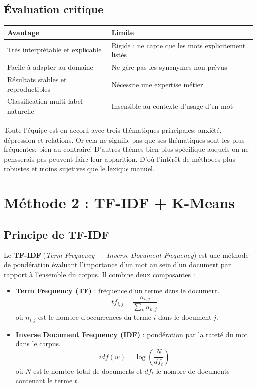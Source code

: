 \documentclass[12pt,a4paper]{report}
\begin{document}
\subsection{Évaluation critique}

\begin{center}
\begin{tabular}{@{}ll@{}}
\toprule
\textbf{Avantage} & \textbf{Limite} \\
\midrule
Très interprétable et explicable & Rigide : ne capte que les mots explicitement listés \\
Facile à adapter au domaine & Ne gère pas les synonymes non prévus \\
Résultats stables et reproductibles & Nécessite une expertise métier \\
Classification multi-label naturelle & Insensible au contexte d'usage d'un mot \\
\bottomrule
\end{tabular}
\end{center}

\bigskip

Toute l'équipe est en accord avec trois thématiques principales: anxiété, dépression et relations.
Or cela ne signifie pas que ses thématiques sont les plus fréquentes,
bien au contraire! D'autres thèmes bien plus spécifique auquels on ne pensserais pas peuvent faire leur apparition. 
D'où l'intérêt de méthodes plus robustes et moins sujetives que le lexique manuel. 

\pagebreak

\section{Méthode 2 : TF-IDF + K-Means}

\subsection{Principe de TF-IDF}

Le \textbf{TF-IDF} (\textit{Term Frequency — Inverse Document Frequency}) est une méthode
de pondération évaluant l'importance d'un mot au sein d'un document par rapport à l'ensemble
du corpus. Il combine deux composantes :

\begin{itemize}
  \item \textbf{Term Frequency (TF)} : fréquence d'un terme dans le document.
  $$tf_{i,j} = \frac{n_{i,j}}{\sum_k n_{k,j}}$$
  où $n_{i,j}$ est le nombre d'occurrences du terme $i$ dans le document $j$.

  \item \textbf{Inverse Document Frequency (IDF)} : pondération par la rareté du mot dans
  le corpus.
  $$idf(w) = \log\!\left(\frac{N}{df_t}\right)$$
  où $N$ est le nombre total de documents et $df_t$ le nombre de documents contenant le terme $t$.
\end{itemize}
\end{document}

